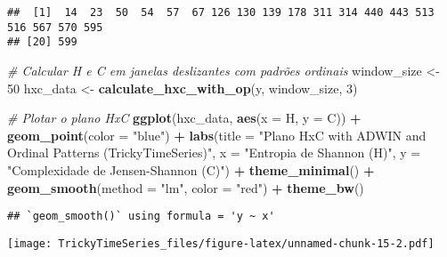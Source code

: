 \documentclass[
]{article}
\newenvironment{Shaded}{\begin{snugshade}}{\end{snugshade}}
\newcommand{\AttributeTok}[1]{\textcolor[rgb]{0.13,0.29,0.53}{#1}}
\newcommand{\CommentTok}[1]{\textcolor[rgb]{0.56,0.35,0.01}{\textit{#1}}}
\newcommand{\DecValTok}[1]{\textcolor[rgb]{0.00,0.00,0.81}{#1}}
\newcommand{\FunctionTok}[1]{\textcolor[rgb]{0.13,0.29,0.53}{\textbf{#1}}}
\newcommand{\NormalTok}[1]{#1}
\newcommand{\OtherTok}[1]{\textcolor[rgb]{0.56,0.35,0.01}{#1}}
\newcommand{\SpecialCharTok}[1]{\textcolor[rgb]{0.81,0.36,0.00}{\textbf{#1}}}
\newcommand{\StringTok}[1]{\textcolor[rgb]{0.31,0.60,0.02}{#1}}
\begin{document}
\begin{verbatim}
##  [1]  14  23  50  54  57  67 126 130 139 178 311 314 440 443 513 516 567 570 595
## [20] 599
\end{verbatim}

\begin{Shaded}
\begin{Highlighting}[]
\CommentTok{\# Calcular H e C em janelas deslizantes com padrões ordinais}
\NormalTok{window\_size }\OtherTok{\textless{}{-}} \DecValTok{50}
\NormalTok{hxc\_data }\OtherTok{\textless{}{-}} \FunctionTok{calculate\_hxc\_with\_op}\NormalTok{(y, window\_size, }\DecValTok{3}\NormalTok{)}

\CommentTok{\# Plotar o plano HxC}
\FunctionTok{ggplot}\NormalTok{(hxc\_data, }\FunctionTok{aes}\NormalTok{(}\AttributeTok{x =}\NormalTok{ H, }\AttributeTok{y =}\NormalTok{ C)) }\SpecialCharTok{+}
  \FunctionTok{geom\_point}\NormalTok{(}\AttributeTok{color =} \StringTok{"blue"}\NormalTok{) }\SpecialCharTok{+}
  \FunctionTok{labs}\NormalTok{(}\AttributeTok{title =} \StringTok{"Plano HxC with ADWIN and Ordinal Patterns (TrickyTimeSeries)"}\NormalTok{,}
       \AttributeTok{x =} \StringTok{"Entropia de Shannon (H)"}\NormalTok{, }\AttributeTok{y =} \StringTok{"Complexidade de Jensen{-}Shannon (C)"}\NormalTok{) }\SpecialCharTok{+}
  \FunctionTok{theme\_minimal}\NormalTok{() }\SpecialCharTok{+}
  \FunctionTok{geom\_smooth}\NormalTok{(}\AttributeTok{method =} \StringTok{"lm"}\NormalTok{, }\AttributeTok{color =} \StringTok{"red"}\NormalTok{) }\SpecialCharTok{+}
  \FunctionTok{theme\_bw}\NormalTok{()}
\end{Highlighting}
\end{Shaded}

\begin{verbatim}
## `geom_smooth()` using formula = 'y ~ x'
\end{verbatim}

\texttt{[image: TrickyTimeSeries\_files/figure-latex/unnamed-chunk-15-2.pdf]}
\end{document}
